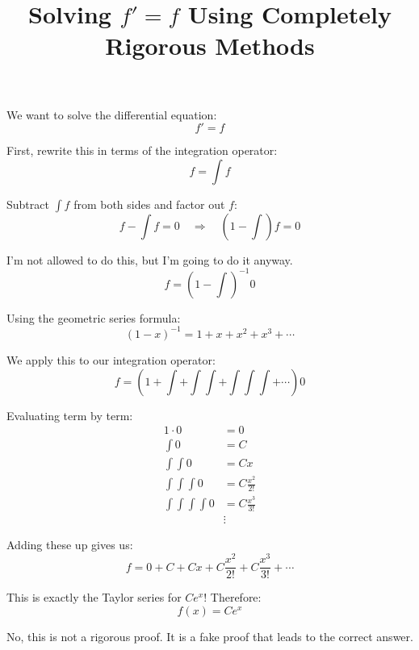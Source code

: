 \documentclass{article}
\title{Solving $f' = f$ Using Completely Rigorous Methods}
\author{}
\date{}
\begin{document}
\maketitle

We want to solve the differential equation:
\[ f' = f \]

First, rewrite this in terms of the integration operator:
\[ f = \int f \]

Subtract $\int f$ from both sides and factor out $f$:
\[ f - \int f = 0 \quad\Longrightarrow\quad \left(1 - \int\right) f = 0 \]

I'm not allowed to do this, but I'm going to do it anyway.
\[ f = (1 - \int)^{-1} 0 \]

Using the geometric series formula:
\[ (1-x)^{-1} = 1 + x + x^2 + x^3 + \cdots \]

We apply this to our integration operator:
\[ f = \left(1 + \int + \int\int + \int\int\int + \cdots\right) 0 \]

Evaluating term by term:
\begin{align*}
1 \cdot 0 &= 0 \\
\int 0 &= C \\
\int\int 0 &= Cx \\
\int\int\int 0 &= C\frac{x^2}{2!} \\
\int\int\int\int 0 &= C\frac{x^3}{3!} \\
&\vdots
\end{align*}

Adding these up gives us:
\[ f = 0 + C + Cx + C\frac{x^2}{2!} + C\frac{x^3}{3!} + \cdots \]

This is exactly the Taylor series for $Ce^x$! Therefore:
\[ f(x) = Ce^x \]

No, this is not a rigorous proof. It is a fake proof that leads to the correct answer.
\end{document}
